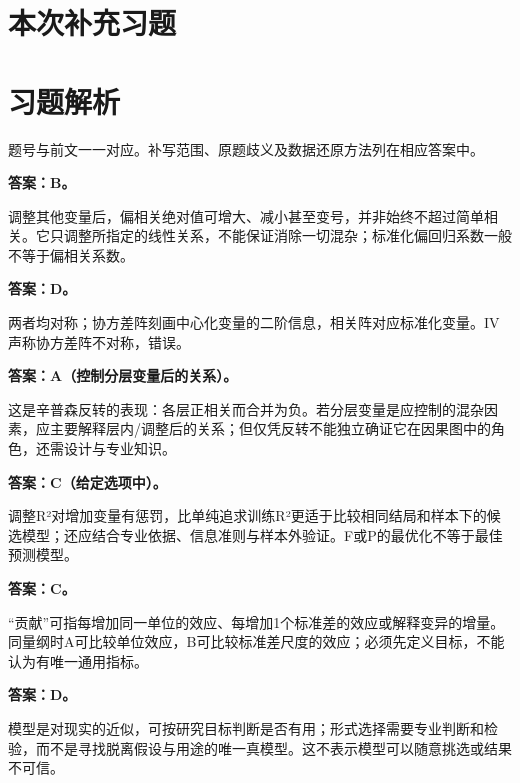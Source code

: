 
\clearpage\section{本次补充习题}


\clearpage\section{习题解析}

\begin{keyidea}[核对方式]题号与前文一一对应。补写范围、原题歧义及数据还原方法列在相应答案中。\end{keyidea}


\textbf{答案：B。}

调整其他变量后，偏相关绝对值可增大、减小甚至变号，并非始终不超过简单相关。它只调整所指定的线性关系，不能保证消除一切混杂；标准化偏回归系数一般不等于偏相关系数。



\textbf{答案：D。}

两者均对称；协方差阵刻画中心化变量的二阶信息，相关阵对应标准化变量。IV声称协方差阵不对称，错误。



\textbf{答案：A（控制分层变量后的关系）。}

这是辛普森反转的表现：各层正相关而合并为负。若分层变量是应控制的混杂因素，应主要解释层内/调整后的关系；但仅凭反转不能独立确证它在因果图中的角色，还需设计与专业知识。



\textbf{答案：C（给定选项中）。}

调整R²对增加变量有惩罚，比单纯追求训练R²更适于比较相同结局和样本下的候选模型；还应结合专业依据、信息准则与样本外验证。F或P的最优化不等于最佳预测模型。



\textbf{答案：C。}

``贡献''可指每增加同一单位的效应、每增加1个标准差的效应或解释变异的增量。同量纲时A可比较单位效应，B可比较标准差尺度的效应；必须先定义目标，不能认为有唯一通用指标。



\textbf{答案：D。}

模型是对现实的近似，可按研究目标判断是否有用；形式选择需要专业判断和检验，而不是寻找脱离假设与用途的唯一真模型。这不表示模型可以随意挑选或结果不可信。


